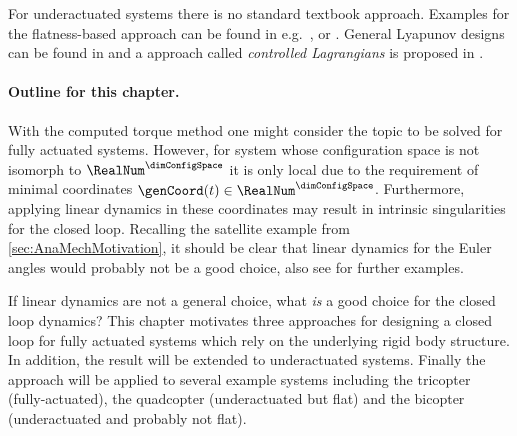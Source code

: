 For underactuated systems there is no standard textbook approach.
Examples for the flatness-based approach can be found in e.g.\ \cite{RathinamFlatness}, \cite{MurrayFlatCataloge} or \cite[sec.\,7.1]{Martin:FlatSystems}.
General Lyapunov designs can be found in \cite{OlfatiSaberDiss} and a approach called \textit{controlled Lagrangians} is proposed in \cite{bloch2000controlled}.

\paragraph{Outline for this chapter.}
With the computed torque method one might consider the topic to be solved for fully actuated systems.
However, for system whose configuration space is not isomorph to $\RealNum^{\dimConfigSpace}$ it is only local due to the requirement of minimal coordinates $\genCoord(t)\in\RealNum^{\dimConfigSpace}$.
Furthermore, applying linear dynamics in these coordinates may result in intrinsic singularities for the closed loop.
Recalling the satellite example from \autoref{sec:AnaMechMotivation}, it should be clear that linear dynamics for the Euler angles would probably not be a good choice, also see \cite{Konz:AT} for further examples.

If linear dynamics are not a general choice, what \textit{is} a good choice for the closed loop dynamics?
This chapter motivates three approaches for designing a closed loop for fully actuated systems which rely on the underlying rigid body structure.
In addition, the result will be extended to underactuated systems.
Finally the approach will be applied to several example systems including the tricopter (fully-actuated), the quadcopter (underactuated but flat) and the bicopter (underactuated and probably not flat).


